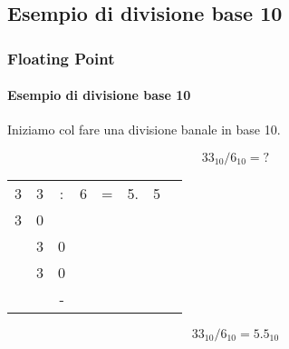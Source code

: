 \documentclass{beamer}
\begin{document}
  	\subsection{Esempio di divisione base 10}
  \begin{frame}
	    \frametitle{Floating Point}
	    \framesubtitle{Esempio di divisione base 10}
				    
	    Iniziamo col fare una divisione banale in base 10.
	    
	    $$33_{10} / 6_{10} = ?$$
	    
	    \pause
	    \vspace{2em}
	    \begin{center}
	    		\setlength{\tabcolsep}{2pt}
	    		\begin{tabular}{cccccccc}
	    			3 & 3 & : & 6 & = & 5. & 5 \\
	    			3 & 0 &   &   &   &    &   \\
	    			\hline
	    			  & 3 & 0 &   &   &    &   \\
	    			  & 3 & 0 &   &   &    &   \\
	    			\hline
	    			  &   & - &   &   &    &   \\
	    		\end{tabular}
	    \end{center}
	    \pause
	    \vspace{2em}
	    $$33_{10} / 6_{10} = 5.5_{10}$$
	\end{frame}
\end{document}
